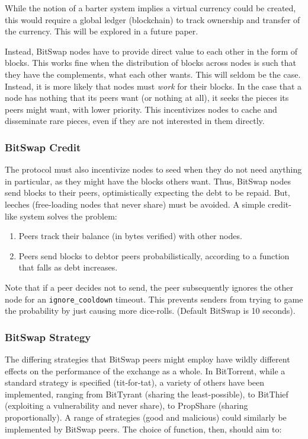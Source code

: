 \documentclass{sig-alternate}
\begin{document}
While the notion of a barter system implies a virtual currency could be
created, this would require a global ledger (blockchain) to track ownership
and transfer of the currency. This will be explored in a future paper.

Instead, BitSwap nodes have to provide direct value to each other
in the form of blocks. This works fine when the distribution of blocks across
nodes is such that they have the complements, what each other wants. This will
seldom be the case. Instead, it is more likely that nodes must \textit{work}
for their blocks. In the case that a node has nothing that its peers want (or
nothing at all), it seeks the pieces its peers might want, with lower
priority. This incentivizes nodes to cache and disseminate rare pieces, even
if they are not interested in them directly.

\subsubsection{BitSwap Credit}

The protocol must also incentivize nodes to seed when they do not need
anything in particular, as they might have the blocks others want. Thus,
BitSwap nodes send blocks to their peers, optimistically expecting the debt to
be repaid. But, leeches (free-loading nodes that never share) must be avoided. A simple credit-like system solves the problem:

\begin{enumerate}
  \item Peers track their balance (in bytes verified) with other nodes.
  \item Peers send blocks to debtor peers probabilistically, according to
        a function that falls as debt increases.
\end{enumerate}

Note that if a peer decides not to send, the peer subsequently ignores the
other node for an \texttt{ignore\_cooldown} timeout. This prevents senders
from trying to game the probability by just causing more dice-rolls.
(Default BitSwap is 10 seconds).

\subsubsection{BitSwap Strategy}

The differing strategies that BitSwap peers might employ have wildly different
effects on the performance of the exchange as a whole. In BitTorrent,
while a standard strategy is specified (tit-for-tat), a variety of others have
been implemented, ranging from BitTyrant (sharing the least-possible),
to BitThief (exploiting a vulnerability and never share), to PropShare
(sharing proportionally). A range of strategies (good and malicious) could
similarly be implemented by BitSwap peers. The choice of function, then, should
aim to:
\end{document}

